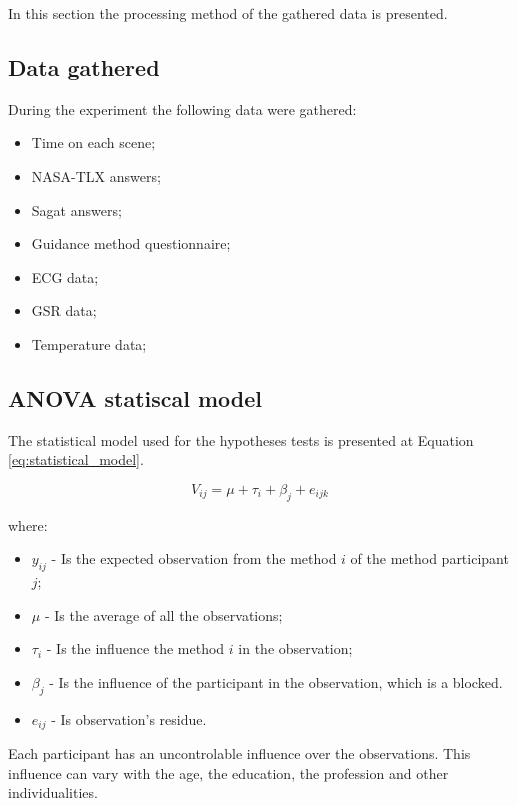 In this section the processing method of the gathered data is presented.

\subsection{Data gathered}

During the experiment the following data were gathered:

\begin{itemize}
    \item Time on each scene;
    \item NASA-TLX answers;
    \item Sagat answers;
    \item Guidance method questionnaire;
    \item ECG data;
    \item GSR data;
    \item Temperature data;
\end{itemize}

\subsection{ANOVA statiscal model}

The statistical model used for the hypotheses tests is presented at Equation \ref{eq:statistical_model}.

\begin{equation}
    \label{eq:statistical_model}
    V_{ij} = \mu + \tau_i + \beta_j + e_{ijk}
\end{equation}

where:

\begin{itemize}
    \item $y_{ij}$ - Is the expected observation from the method $i$ of the method participant $j$;
    \item $\mu$ - Is the average of all the observations;
    \item $\tau_i$ - Is the influence the method $i$ in the observation;
    \item $\beta_j$ - Is the influence of the participant in the observation, which is a blocked.
    \item $e_{ij}$ - Is observation's residue.
\end{itemize}

Each participant has an uncontrolable influence over the observations. This influence can vary with the age, the education, the profession and other individualities.

